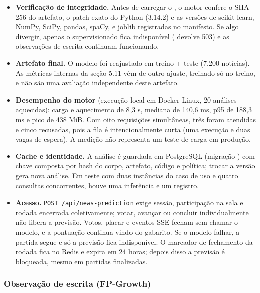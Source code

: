 \documentclass[
  brazilian,
  11pt,
]{article}
\begin{document}
\begin{itemize}
\item \textbf{Verificação de integridade.} Antes de carregar o , o motor confere o SHA-256 do artefato, o patch exato do Python (3.14.2) e as versões de scikit-learn, NumPy, SciPy, pandas, spaCy,  e joblib registradas no manifesto. Se algo divergir, apenas o supervisionado fica indisponível ( devolve 503) e as observações de escrita continuam funcionando.
\item \textbf{Artefato final.} O modelo foi reajustado em treino + teste (7.200 notícias). As métricas internas da seção 5.11 vêm de outro ajuste, treinado só no treino, e não são uma avaliação independente deste artefato.
\item \textbf{Desempenho do motor} (execução local em Docker Linux, 20 análises aquecidas): carga e aquecimento de 8,3 s, mediana de 140,6 ms, p95 de 188,3 ms e pico de 438 MiB. Com oito requisições simultâneas, três foram atendidas e cinco recusadas, pois a fila é intencionalmente curta (uma execução e duas vagas de espera). A medição não representa um teste de carga em produção.
\item \textbf{Cache e identidade.} A análise é guardada em PostgreSQL (migração ) com chave composta por hash do corpo, artefato, código e política; trocar a versão gera nova análise. Em teste com duas instâncias do caso de uso e quatro consultas concorrentes, houve uma inferência e um registro.
\item \textbf{Acesso.} \texttt{POST /api/news-prediction} exige sessão, participação na sala e rodada encerrada coletivamente; votar, avançar ou concluir individualmente não libera a previsão. Votos, placar e eventos SSE fecham sem chamar o modelo, e a pontuação continua vindo do gabarito. Se o modelo falhar, a partida segue e só a previsão fica indisponível. O marcador de fechamento da rodada fica no Redis e expira em 24 horas; depois disso a previsão é bloqueada, mesmo em partidas finalizadas.
\end{itemize}

\subsubsection{Observação de escrita (FP-Growth)}
\end{document}
